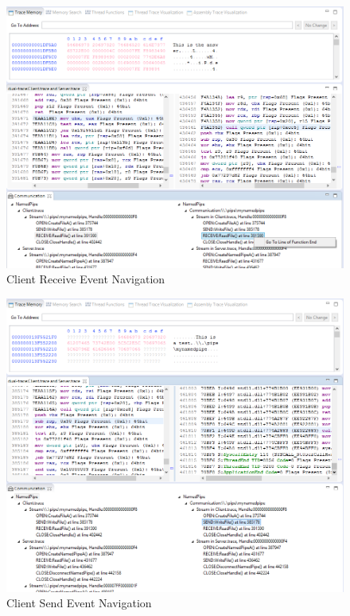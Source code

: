 \begin{figure}[H]
\centerline{\includegraphics[scale=0.4]{Figures/result1_client_read}}
 \caption{Client Receive Event Navigation}
\label{result1_client_read}
\end{figure}

\begin{figure}[H]
\centerline{\includegraphics[scale=0.4]{Figures/result1_client_send}}
 \caption{Client Send Event Navigation}
\label{result1_client_send}
\end{figure}

